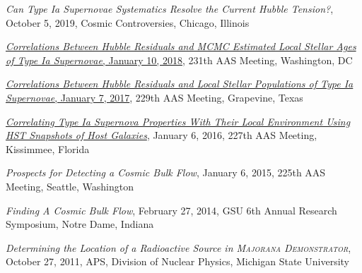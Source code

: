 \documentclass[margin]{res}
\begin{document}
\begin{resume}
\hangindent=15pt 
{\sl Can Type Ia Supernovae Systematics Resolve the Current Hubble Tension?}, October 5, 2019, Cosmic Controversies, Chicago, Illinois
\vspace{-12pt}

\hangindent=15pt 
\href{https://ui.adsabs.harvard.edu/#abs/2018AAS...23124512R/abstract}{{\sl Correlations Between Hubble Residuals and MCMC Estimated Local Stellar Ages of Type Ia Supernovae}, January 10, 2018}, 231th AAS Meeting, Washington, DC
\vspace{-12pt}


\hangindent=15pt 
\href{https://ui.adsabs.harvard.edu/#abs/2017AAS...22943402R/abstract}{{\sl Correlations Between Hubble Residuals and Local Stellar Populations of Type Ia Supernovae}, January 7, 2017}, 229th AAS Meeting, Grapevine, Texas
\vspace{-12pt}

\hangindent=15pt 
\href{https://ui.adsabs.harvard.edu/#abs/2016AAS...22723711R/abstract}{{\sl Correlating Type Ia Supernova Properties With Their Local Environment Using HST Snapshots of Host Galaxies}}, January 6, 2016, 227th AAS Meeting, Kissimmee, Florida
\vspace{-12pt}

\hangindent=15pt 
{\sl Prospects for Detecting a Cosmic Bulk Flow},  January 6, 2015, 225th AAS Meeting, Seattle, Washington 
\vspace{-12pt}

\hangindent=15pt 
{\sl Finding A Cosmic Bulk Flow}, February 27, 2014, GSU 6th Annual Research Symposium, Notre Dame, Indiana
\vspace{-12pt}

\hangindent=15pt 
{\sl Determining the Location of a Radioactive Source in \textsc{Majorana Demonstrator}}, October 27, 2011, APS, Division of Nuclear Physics, Michigan State University 


\begin{comment}
\href{https://ui.adsabs.harvard.edu/#abs/2017AAS...22943402R/abstract}{{\sl Correlations Between Hubble Residuals and Local Stellar Populations}} \hfill {\bf January 7, 2017} \\
\textit{of Type Ia Supernovae}\\
AAS 229th Meeting, Grapevine, Texas


\end{comment}
\end{resume}
\end{document}
